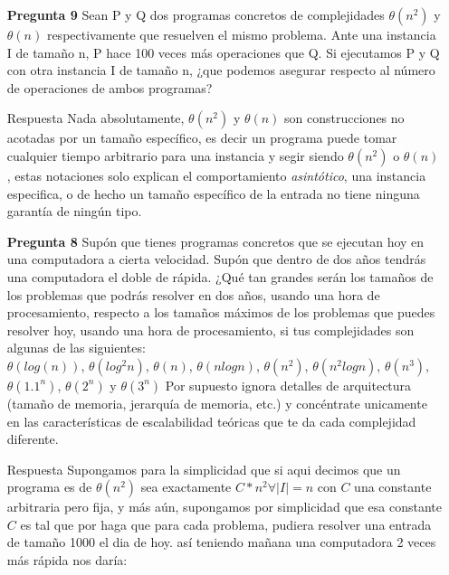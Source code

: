 \documentclass[12pt]{article}
\begin{document}
\begin{itemize}
\item[\bf{Pregunta 9}]Sean P y Q dos programas concretos de complejidades $\theta(n^2)$ y $\theta(n)$ respectivamente que resuelven el mismo problema. Ante una instancia I de tamaño n, P hace 100 veces más operaciones que Q. Si ejecutamos P y Q con otra instancia I de tamaño n, ¿que podemos asegurar respecto al número de operaciones de ambos programas?

\item[Respuesta] Nada absolutamente, $\theta(n^2)$ y $\theta(n)$ son construcciones no acotadas por un tamaño específico, es decir un programa puede tomar cualquier tiempo arbitrario para una instancia y segir siendo $\theta(n^2)$ o $\theta(n)$, estas notaciones solo explican el comportamiento \emph{asintótico}, una instancia especifica, o de hecho un tamaño específico de la entrada no tiene ninguna garantía de ningún tipo.

\item[\bf{Pregunta 8}]Supón que tienes programas concretos que se ejecutan hoy en una computadora a cierta velocidad. Supón que dentro de dos años tendrás una computadora el doble de rápida. ¿Qué tan grandes serán los tamaños de los problemas que podrás resolver en dos años, usando una hora de procesamiento, respecto a los tamaños máximos de los problemas que puedes resolver hoy, usando una hora de procesamiento, si tus complejidades son algunas de las siguientes:\\

$\theta(log(n))$, $\theta(log^2 n)$, $\theta(n)$, $\theta(nlogn)$, $\theta(n^2)$, $\theta(n^2logn)$, $\theta(n^3)$, $\theta(1.1^n )$, $\theta(2^n)$ y $\theta(3^n)$ Por supuesto ignora detalles de arquitectura (tamaño de memoria, jerarquía de memoria, etc.) y concéntrate unicamente en las características de escalabilidad teóricas que te da cada complejidad diferente.

\item[Respuesta] Supongamos para la simplicidad que si aqui decimos que un programa es de $\theta(n^2)$ sea exactamente $C*n^2 \forall |I|=n$ con $C$ una constante arbitraria pero fija, y más aún, supongamos por simplicidad que esa constante $C$ es tal que por haga que para cada problema, pudiera resolver una entrada de tamaño 1000 el dia de hoy.
así teniendo mañana una computadora 2 veces más rápida nos daría:


\end{itemize}
\end{document}
